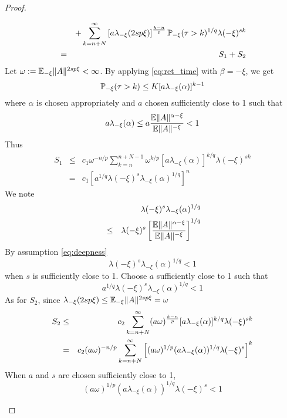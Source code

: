 \documentclass{article}
\theoremstyle{remark}
\begin{document}
\begin{proof}
\begin{enumerate}
\begin{eqnarray*}
      && + \sum_{k=n+N}^\infty \left[
        a \lambda_{-\xi}(2sp\xi)
      \right]^{k-n \over p} \P_{-\xi}(\tau > k)^{1/q}
      \lambda(-\xi)^{sk} \\
      &=& S_1 + S_2
    \end{eqnarray*}
    Let $\omega := \E_{-\xi} \|A\|^{2sp\xi} < \infty$. By applying
    \eqref{eq:ret_time} with $\beta = -\xi$, we get
    \[
    \P_{-\xi}(\tau > k) \leq K [a \lambda_{-\xi}(\alpha)]^{k-1}
    \]
    where $\alpha$ is chosen appropriately and $a$ chosen sufficiently
    close to 1 such that
    \[
    a \lambda_{-\xi}(\alpha) \leq a {
      \E \|A\|^{\alpha - \xi}
      \over
      \E \|A\|^{-\xi}
    } < 1
    \]
    Thus
    \begin{eqnarray}
      S_1 &\leq& c_1 \omega^{-n/p}
      \sum_{k=n}^{n+N-1} \omega^{k/p}
      [a \lambda_{-\xi}(\alpha)]^{k/q}
      \lambda(-\xi)^{sk} \nonumber \\
      &=& c_1 \left[
        a^{1/q} \lambda(-\xi)^s \lambda_{-\xi}(\alpha)^{1/q}
      \right]^{n} \label{eq:S_1}
    \end{eqnarray}
    We note
    \begin{eqnarray*}
      && \lambda(-\xi)^s \lambda_{-\xi}(\alpha)^{1/q}\\
      &\leq& \lambda(-\xi)^s \left[
        {
          \E \|A\|^{\alpha - \xi}
          \over
          \E \|A\|^{-\xi}
        }
      \right]^{1/q}
    \end{eqnarray*}
    By assumption \eqref{eq:deepness}
    \[
    \lambda(-\xi)^s \lambda_{-\xi}(\alpha)^{1/q} < 1
    \]
    when $s$ is sufficiently close to 1. Choose $a$ sufficiently
    close to 1 such that
    \begin{equation}
      \label{eq:S_1_kern}
      a^{1/q} \lambda(-\xi)^s \lambda_{-\xi}(\alpha)^{1/q} < 1
    \end{equation}
    As for $S_2$, since
    $\lambda_{-\xi}(2sp\xi) \leq \E_{-\xi}\|A\|^{2sp\xi} = \omega$
    \begin{eqnarray*}
      S_2 &\leq& c_2 \sum_{k=n+N}^\infty
      (a \omega)^{k-n \over p}
      [a \lambda_{-\xi}(\alpha)]^{k/q}
      \lambda(-\xi)^{sk} \\
      &=& c_2 (a \omega)^{-n/p}
      \sum_{k=n+N}^\infty \left[
        (a \omega)^{1/p}
        (a \lambda_{-\xi}(\alpha))^{1/q}
        \lambda(-\xi)^s
      \right]^k
    \end{eqnarray*}
    When $a$ and $s$ are chosen sufficiently close to 1,
    \[
    (a \omega)^{1/p}
    (a \lambda_{-\xi}(\alpha))^{1/q}
    \lambda(-\xi)^s < 1
\]
\end{enumerate}
\end{proof}
\end{document}
